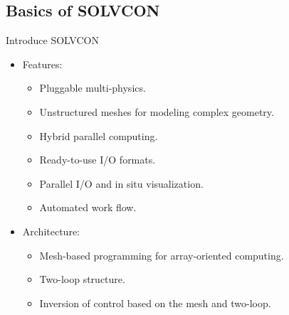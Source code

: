 \documentclass[dvips,xcolor=pst,14pt]{beamer}
\begin{document}
\subsection{
Basics of SOLVCON
}

\begin{frame}{
%
Introduce SOLVCON
%
}
\begin{itemize}
  \item Features:
  \begin{itemize}
    \item Pluggable multi-physics.
    \item Unstructured meshes for modeling complex geometry.
    \item Hybrid parallel computing.
    \item Ready-to-use I/O formats.
    \item Parallel I/O and in situ visualization.
    \item Automated work flow.
  \end{itemize}
  \item Architecture:
  \begin{itemize}
    \item Mesh-based programming for array-oriented computing.
    \item Two-loop structure.
    \item Inversion of control based on the mesh and two-loop.
  \end{itemize}
\end{itemize}
\end{frame}

\end{document}
